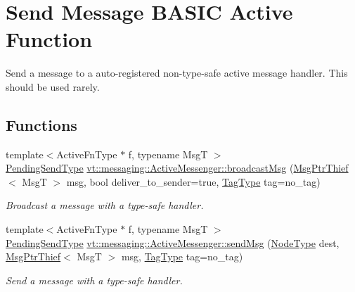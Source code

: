 \hypertarget{group__basicsend}{}\section{Send Message B\+A\+S\+IC Active Function}
\label{group__basicsend}


Send a message to a auto-\/registered non-\/type-\/safe active message handler. This should be used rarely.  


\subsection*{Functions}
\begin{DoxyCompactItemize}
\item 
{\footnotesize template$<$Active\+Fn\+Type $\ast$ f, typename MsgT $>$ }\\\hyperlink{structvt_1_1messaging_1_1_active_messenger_a3626a6ca76d8ad4ec7c3b47a2c70d3a8}{Pending\+Send\+Type} \hyperlink{group__basicsend_ga880e93f0c239c1aa9c9ade805d75dd7a}{vt\+::messaging\+::\+Active\+Messenger\+::broadcast\+Msg} (\hyperlink{structvt_1_1messaging_1_1_msg_ptr_thief}{Msg\+Ptr\+Thief}$<$ MsgT $>$ msg, bool deliver\+\_\+to\+\_\+sender=true, \hyperlink{namespacevt_a84ab281dae04a52a4b243d6bf62d0e52}{Tag\+Type} tag=no\+\_\+tag)
\begin{DoxyCompactList}\small\item\em Broadcast a message with a type-\/safe handler. \end{DoxyCompactList}\item 
{\footnotesize template$<$Active\+Fn\+Type $\ast$ f, typename MsgT $>$ }\\\hyperlink{structvt_1_1messaging_1_1_active_messenger_a3626a6ca76d8ad4ec7c3b47a2c70d3a8}{Pending\+Send\+Type} \hyperlink{group__basicsend_gaab0dc380a72f038f4fc2350ba89de98f}{vt\+::messaging\+::\+Active\+Messenger\+::send\+Msg} (\hyperlink{namespacevt_a866da9d0efc19c0a1ce79e9e492f47e2}{Node\+Type} dest, \hyperlink{structvt_1_1messaging_1_1_msg_ptr_thief}{Msg\+Ptr\+Thief}$<$ MsgT $>$ msg, \hyperlink{namespacevt_a84ab281dae04a52a4b243d6bf62d0e52}{Tag\+Type} tag=no\+\_\+tag)
\begin{DoxyCompactList}\small\item\em Send a message with a type-\/safe handler. \end{DoxyCompactList}\end{DoxyCompactItemize}


